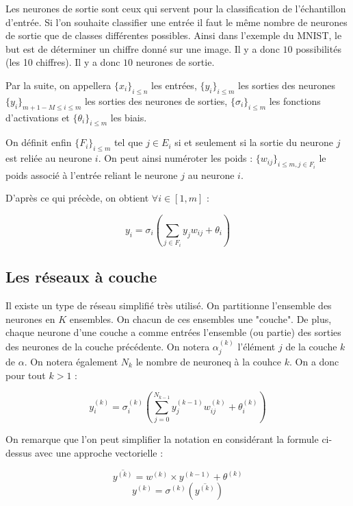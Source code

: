 \medskip

Les neurones de sortie sont ceux qui servent pour la classification de
l'échantillon d'entrée. Si l'on souhaite classifier une entrée il faut le même
nombre de neurones de sortie que de classes différentes possibles. Ainsi dans
l'exemple du MNIST, le but est de déterminer un chiffre donné sur une image.
Il y a donc $10$ possibilités (les 10 chiffres). Il y a donc $10$ neurones de
sortie.

\medskip

Par la suite, on appellera $\{x_i\}_{i \leq n}$ les entrées, $\{y_i\}_{i \leq m}$
 les sorties des neurones $\{y_i\}_{m+1-M \leq i \leq m}$ les sorties des
neurones de sorties, $\{\sigma_i\}_{i \leq m}$ les fonctions d'activations et
$\{\theta_i\}_{i \leq m}$ les biais.

\medskip

On définit enfin $\{F_i\}_{i \leq m}$ tel que $j \in E_i$ si et seulement si la
sortie du neurone $j$ est reliée au neurone $i$. On peut ainsi numéroter les
poids : $\{w_{ij}\}_{i \leq m, j \in F_i} $ le poids associé à l'entrée reliant
le neurone $j$ au neurone $i$.

\medskip

D'après ce qui précède, on obtient $\forall i \in [1, m]$ :

\[y_i = \sigma_i(\sum_{j \in F_i} y_jw_{ij} + \theta_i) \]

\subsection{Les réseaux à couche}

Il existe un type de réseau simplifié très utilisé. On partitionne l'ensemble
des neurones en $K$ ensembles. On chacun de ces ensembles une "couche". De plus,
chaque neurone d'une couche a comme entrées l'ensemble (ou partie) des sorties
des neurones de la couche précédente. On notera $\alpha^{(k)}_j$ l'élément $j$
de la couche $k$ de $\alpha$. On notera également $N_k$ le nombre de neuroneq à
la couhce $k$. On a donc pour tout $k > 1$ :

\[y_i^{(k)} = \sigma_i^{(k)}(\sum_{j = 0}^{N_{k-1}} y_j^{(k-1)}w_{ij}^{(k)} + \theta_i^{(k)}) \]

On remarque que l'on peut simplifier la notation en considérant la formule
ci-dessus avec une approche vectorielle :

\[\overline{y^{(k)}} = w^{(k)} \times y^{(k-1)} + \theta^{(k)}\]
\[y^{(k)} = \sigma^{(k)}(\overline{y^{(k)}}) \]

